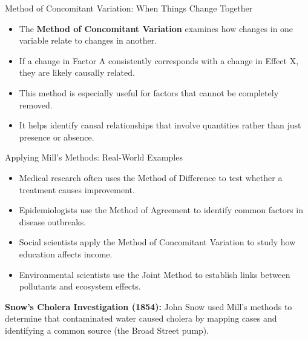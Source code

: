 \documentclass{beamer}
\begin{document}
\begin{frame}{Method of Concomitant Variation: When Things Change Together}
    \begin{itemize}
        \item The \textbf{Method of Concomitant Variation} examines how changes in one variable relate to changes in another.
        \item If a change in Factor A consistently corresponds with a change in Effect X, they are likely causally related.
        \item This method is especially useful for factors that cannot be completely removed.
        \item It helps identify causal relationships that involve quantities rather than just presence or absence.
    \end{itemize}
    
    \begin{center}
    \end{center}
\end{frame}

\begin{frame}{Applying Mill's Methods: Real-World Examples}
    \begin{itemize}
        \item Medical research often uses the Method of Difference to test whether a treatment causes improvement.
        \item Epidemiologists use the Method of Agreement to identify common factors in disease outbreaks.
        \item Social scientists apply the Method of Concomitant Variation to study how education affects income.
        \item Environmental scientists use the Joint Method to establish links between pollutants and ecosystem effects.
    \end{itemize}
    
    \begin{example}
        \textbf{Snow's Cholera Investigation (1854):} John Snow used Mill's methods to determine that contaminated water caused cholera by mapping cases and identifying a common source (the Broad Street pump).
    \end{example}
\end{frame}
\end{document}
